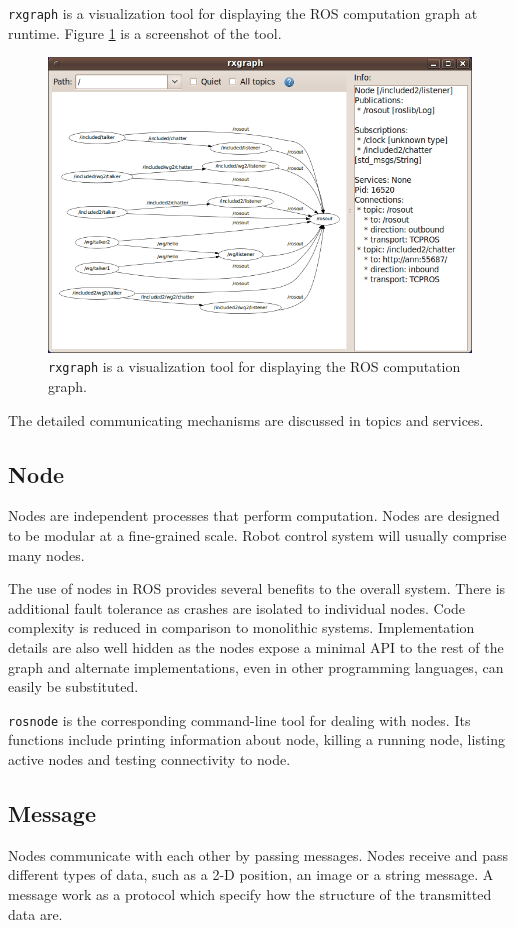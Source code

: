 \documentclass[a4paper, 10pt, conference]{ieeeconf}       %
\begin{document}
\texttt{rxgraph} is a visualization tool for displaying the ROS computation graph at runtime. Figure \ref{fig:rxgraph} is a screenshot of the tool.

\begin{figure}[htpb]
  \centering
  \includegraphics[width=.48\textwidth]{rxgraph}
  \caption{\texttt{rxgraph} is a visualization tool for displaying the ROS computation graph.}
  \label{fig:rxgraph}
\end{figure}

The detailed communicating mechanisms are discussed in topics and services.

\subsection{Node} 

Nodes are independent processes that perform computation. Nodes are designed to be modular at a fine-grained scale. Robot control system will usually comprise many nodes.

The use of nodes in ROS provides several benefits to the overall system. There is additional fault tolerance as crashes are isolated to individual nodes. Code complexity is reduced in comparison to monolithic systems. Implementation details are also well hidden as the nodes expose a minimal API to the rest of the graph and alternate implementations, even in other programming languages, can easily be substituted.

\texttt{rosnode} is the corresponding command-line tool for dealing with nodes. Its functions include printing information about node, killing a running node, listing active nodes and testing connectivity to node.

\subsection{Message}

Nodes communicate with each other by passing messages. Nodes receive and pass different types of data, such as a 2-D position, an image or a string message. A message work as a protocol which specify how the structure of the transmitted data are.
\end{document}
